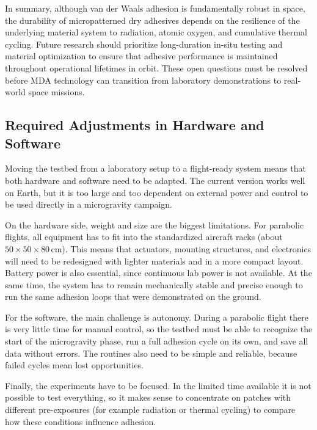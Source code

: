 \documentclass[
    twocolumn,
    fontsize = 10pt,
    parskip = half+,
    headings = small,
    headwidth = text,
    footwidth = text,
]{scrartcl}
\begin{document}

In summary, although van der Waals adhesion is fundamentally robust in space, 
the durability of micropatterned dry adhesives depends on the resilience of the underlying material system 
to radiation, atomic oxygen, and cumulative thermal cycling. 
Future research should prioritize long-duration in-situ testing and material optimization 
to ensure that adhesive performance is maintained throughout operational lifetimes in orbit. 
These open questions must be resolved before MDA technology can transition from laboratory demonstrations to real-world space missions.


\subsection{Required Adjustments in Hardware and Software}

Moving the testbed from a laboratory setup to a flight-ready system means that both hardware and software need to be adapted. 
The current version works well on Earth, but it is too large and too dependent on external power and control to be used directly in a microgravity campaign.  

On the hardware side, weight and size are the biggest limitations. 
For parabolic flights, all equipment has to fit into the standardized aircraft racks (about $50 \times 50 \times 80$\,cm). 
This means that actuators, mounting structures, and electronics will need to be redesigned with lighter materials and in a more compact layout. 
Battery power is also essential, since continuous lab power is not available. 
At the same time, the system has to remain mechanically stable and precise enough to run the same adhesion loops that were demonstrated on the ground.  

For the software, the main challenge is autonomy. 
During a parabolic flight there is very little time for manual control, 
so the testbed must be able to recognize the start of the microgravity phase, 
run a full adhesion cycle on its own, and save all data without errors. 
The routines also need to be simple and reliable, because failed cycles mean lost opportunities.  

Finally, the experiments have to be focused. 
In the limited time available it is not possible to test everything, 
so it makes sense to concentrate on patches with different pre-exposures (for example radiation or thermal cycling) 
to compare how these conditions influence adhesion.  
\end{document}
